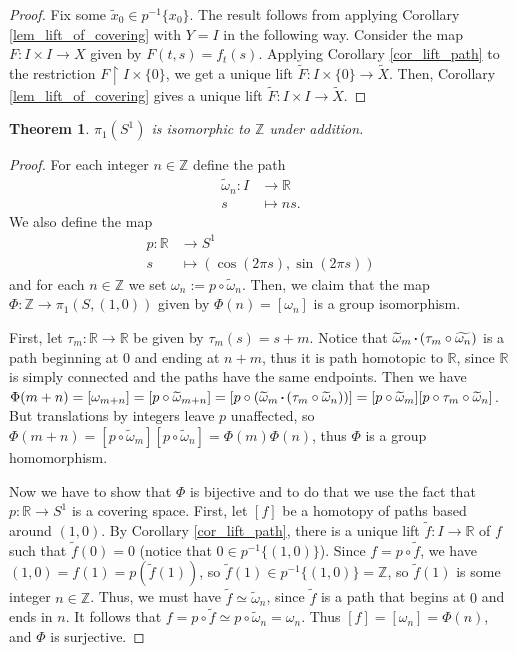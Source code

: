 \documentclass{report}
\newtheorem{theorem}{Theorem}[section]
\theoremstyle{definition}
\theoremstyle{remark}
\newcommand{\Z}{\mathbb{Z}}
\newcommand{\R}{\mathbb{R}}
\newcommand{\set}[1]{\{#1\}}
\newcommand*\concat{\mathbin{\vcenter{\hbox{\rule{.3ex}{.3ex}}}}}
\let\oldsin\sin
\let\oldcos\cos
\renewcommand{\sin}[1]{\oldsin \left( #1 \right)}
\renewcommand{\cos}[1]{\oldcos \left( #1 \right)}
\begin{document}
\begin{proof}
    Fix some $\tilde{x}_0 \in p^{-1}\set{x_0}$. The result follows from applying Corollary \ref{lem_lift_of_covering} with $Y = I$ in the following way. Consider the map $F : I \times I \to X$ given by $F(t, s) = f_t(s)$. Applying Corollary \ref{cor_lift_path} to the restriction $F \restriction{I \times \set{0}}$, we get a unique lift $\tilde{F} : I \times \set{0} \to \tilde{X}$. Then, Corollary \ref{lem_lift_of_covering} gives a unique lift $\tilde{F} : I \times I \to \tilde{X}$.
\end{proof}

\begin{theorem}
    $\pi_1(S^1)$ is isomorphic to $\Z$ under addition.
\end{theorem}

\begin{proof}
    For each integer $n \in \Z$ define the path 
    \begin{align*}
        \widetilde{\omega}_n : I &\to \R \\
        s &\mapsto n s.
    \end{align*} We also define the map 
    \begin{align*}
        p : \R &\to S^1 \\ 
        s &\mapsto (\cos{2 \pi s}, \sin{2 \pi s})
    \end{align*} and for each $n \in \Z$ we set $\omega_n := p \circ \widetilde{\omega}_n$. Then, we claim that the map $\Phi : \Z \to \pi_1(S, (1, 0))$ given by $\Phi(n) = [\omega_n]$ is a group isomorphism.
    
    First, let $\tau_m : \R \to \R$ be given by $\tau_m(s) = s + m$. Notice that $\widetilde{\omega}_m \concat (\tau_m \circ \widetilde{\omega_n})$ is a path beginning at $0$ and ending at $n + m$, thus it is path homotopic to $\R$, since $\R$ is simply connected and the paths have the same endpoints. Then we have $\Phi(m + n) = [\omega_{m + n}] = [p \circ \widetilde{\omega}_{m+n}] = [p \circ (\widetilde{\omega}_m \concat (\tau_m \circ \widetilde{\omega}_n))] = [p \circ \widetilde{\omega}_m][p \circ \tau_m \circ \widetilde{\omega}_n]$. But translations by integers leave $p$ unaffected, so $\Phi(m + n)  = [p \circ \widetilde{\omega}_m] [p \circ \widetilde{\omega}_n] = \Phi(m) \Phi(n)$, thus $\Phi$ is a group homomorphism.
    
    Now we have to show that $\Phi$ is bijective and to do that we use the fact that $p : \R \to S^1$ is a covering space. First, let $[f]$ be a homotopy of paths based around $(1, 0)$. By Corollary \ref{cor_lift_path}, there is a unique lift $\tilde{f} : I \to \R$ of $f$ such that $\tilde{f}(0) = 0$ (notice that $0 \in p^{-1}\set{(1, 0)}$). Since $f = p \circ \tilde{f}$, we have $(1, 0)=f(1) = p (\tilde{f}(1))$, so $\tilde{f}(1) \in p^{-1}\set{(1, 0)} = \Z$, so $\tilde{f}(1)$ is some integer $n \in \Z$. Thus, we must have $\tilde{f} \simeq \tilde{\omega}_n$, since $\tilde{f}$ is a path that begins at $0$ and ends in $n$. It follows that $f = p \circ \tilde{f} \simeq p \circ \tilde{\omega}_n = \omega_n$. Thus $[f] = [\omega_n] = \Phi(n)$, and $\Phi$ is surjective.
    

\end{proof}
\end{document}
